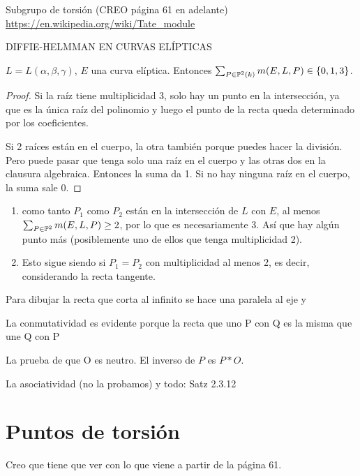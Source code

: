 \documentclass[CR.tex]{subfiles}
\begin{document}
Subgrupo de torsión (CREO página 61 en adelante) \url{https://en.wikipedia.org/wiki/Tate_module}

DIFFIE-HELMMAN EN CURVAS ELÍPTICAS

\begin{lemma}[Satz 2.3.8]
$L=L(\alpha,\beta,\gamma)$, $E$ una curva elíptica. Entonces $\sum_{P\in\mathbb{P}^2(k)}m(E,L,P)\in\{0,1,3\}$.
\end{lemma}
\begin{proof}
Si la raíz tiene multiplicidad 3, solo hay un punto en la intersección, ya que es la única raíz del polinomio y luego el punto de la recta queda determinado por los coeficientes. 


Si 2 raíces están en el cuerpo, la otra también porque puedes hacer la división. Pero puede pasar que tenga solo una raíz en el cuerpo y las otras dos en la clausura algebraica. Entonces la suma da 1. Si no hay ninguna raíz en el cuerpo, la suma sale 0. 
\end{proof}

\begin{coro}[Korollar 2.3.9]
\begin{enumerate}
\item como tanto $P_1$ como $P_2$ están en la intersección de $L$ con $E$, al menos $\sum_{P\in\mathbb{P}^2}m(E,L,P)\geq 2$, por lo que es necesariamente 3. Así que hay algún punto más (posiblemente uno de ellos que tenga multiplicidad 2). 
\item Esto sigue siendo si $P_1=P_2$ con multiplicidad al menos 2, es decir, considerando la recta tangente. 
\end{enumerate}
\end{coro}

\begin{defi}[Definition 2.3.10]

\end{defi}
Para dibujar la recta que corta al infinito se hace una paralela al eje y

La conmutatividad es evidente porque la recta que uno P con Q es la misma que une Q con P


La prueba de que O es neutro. El inverso de $P$ es $P*O$. 


La asociatividad (no la probamos) y todo: Satz 2.3.12

\section{Puntos de torsión}

Creo que tiene que ver con lo que viene a partir de la página 61.
\end{document}
